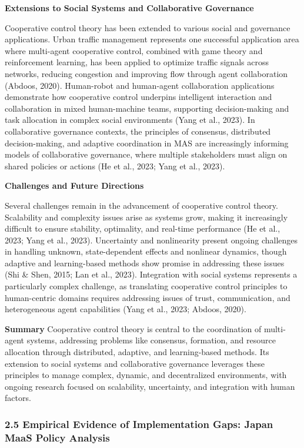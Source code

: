 \textbf{Extensions to Social Systems and Collaborative Governance}

Cooperative control theory has been extended to various social and governance applications. Urban traffic management represents one successful application area where multi-agent cooperative control, combined with game theory and reinforcement learning, has been applied to optimize traffic signals across networks, reducing congestion and improving flow through agent collaboration (Abdoos, 2020). Human-robot and human-agent collaboration applications demonstrate how cooperative control underpins intelligent interaction and collaboration in mixed human-machine teams, supporting decision-making and task allocation in complex social environments (Yang et al., 2023). In collaborative governance contexts, the principles of consensus, distributed decision-making, and adaptive coordination in MAS are increasingly informing models of collaborative governance, where multiple stakeholders must align on shared policies or actions (He et al., 2023; Yang et al., 2023).

\textbf{Challenges and Future Directions}

Several challenges remain in the advancement of cooperative control theory. Scalability and complexity issues arise as systems grow, making it increasingly difficult to ensure stability, optimality, and real-time performance (He et al., 2023; Yang et al., 2023). Uncertainty and nonlinearity present ongoing challenges in handling unknown, state-dependent effects and nonlinear dynamics, though adaptive and learning-based methods show promise in addressing these issues (Shi \& Shen, 2015; Lan et al., 2023). Integration with social systems represents a particularly complex challenge, as translating cooperative control principles to human-centric domains requires addressing issues of trust, communication, and heterogeneous agent capabilities (Yang et al., 2023; Abdoos, 2020).

\textbf{Summary} Cooperative control theory is central to the coordination of multi-agent systems, addressing problems like consensus, formation, and resource allocation through distributed, adaptive, and learning-based methods. Its extension to social systems and collaborative governance leverages these principles to manage complex, dynamic, and decentralized environments, with ongoing research focused on scalability, uncertainty, and integration with human factors.

\subsubsection{2.5 Empirical Evidence of Implementation Gaps: Japan MaaS Policy Analysis}\label{empirical-evidence-of-implementation-gaps-japan-maas-policy-analysis}

